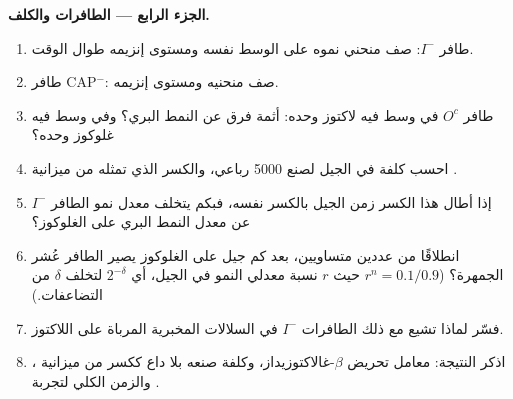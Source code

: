 \begin{problem}
\medskip
\noindent\textbf{الجزء الرابع --- الطافرات والكلف.}
\begin{enumerate}[resume]
  \item طافر $I^-$: صف منحني نموه على الوسط نفسه ومستوى إنزيمه
        طوال الوقت.
  \item طافر CAP$^-$: صف منحنيه ومستوى إنزيمه.
  \item طافر $O^c$ في وسط فيه لاكتوز وحده: أثمة فرق عن النمط
        البري؟ وفي وسط فيه غلوكوز وحده؟
  \item احسب كلفة  في الجيل لصنع \num{5000} رباعي، والكسر الذي
        تمثله من ميزانية .
  \item إذا أطال هذا الكسر زمن الجيل بالكسر نفسه، فبكم يتخلف معدل
        نمو الطافر $I^-$ عن معدل النمط البري على الغلوكوز؟
  \item انطلاقًا من عددين متساويين، بعد كم جيل على الغلوكوز يصير
        الطافر عُشر الجمهرة؟ ($r^n =
        0.1/0.9$ حيث $r$ نسبة معدلي النمو في الجيل، أي
        $2^{-\delta}$ لتخلف $\delta$ من التضاعفات.)
  \item فسّر لماذا تشيع مع ذلك الطافرات $I^-$ في السلالات
        المخبرية المرباة على اللاكتوز.
  \item اذكر النتيجة: معامل تحريض $\beta$-غالاكتوزيداز، وكلفة
        صنعه بلا داع ككسر من ميزانية ، والزمن الكلي لتجربة
        .
\end{enumerate}
\end{problem}
